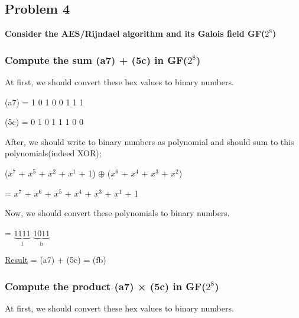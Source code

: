 \documentclass[11pt]{article}
\begin{document}
\subsection{Problem 4}
\textbf{Consider the AES/Rijndael algorithm and its Galois field GF($2^{8}$)}
\subsubsection{Compute the sum (a7) + (5c) in GF($2^{8}$)}

At first, we should convert these hex values to binary numbers.\\

\begin{center}
  (a7) = 1 0 1 0 0 1 1 1
\end{center}

\begin{center}
  (5c) = 0 1 0 1 1 1 0 0
\end{center}



After, we should write to binary numbers as polynomial and should sum to this polynomials(indeed XOR);\\


\begin{center}
  ($x^{7}$ + $x^{5}$ + $x^{2}$ + $x^{1}$ + 1) $\oplus$ ($x^{6}$ + $x^{4}$ + $x^{3}$ + $x^{2}$)\\
\end{center}

\begin{center}
  = $x^{7}$ + $x^{6}$ + $x^{5}$ + $x^{4}$ + $x^{3}$ + $x^{1}$ + 1\\
\end{center}


Now, we should convert these polynomials to binary numbers.\\

\begin{center}
  = $\underbrace{1 1 1 1}_\text{f}$ $\underbrace{1 0 1 1}_\text{b}$
\end{center}


\underline{Result} = (a7) + (5c) = (fb)

\subsubsection{Compute the product (a7) × (5c) in GF($2^{8}$)}

At first, we should convert these hex values to binary numbers.\\
\end{document}
